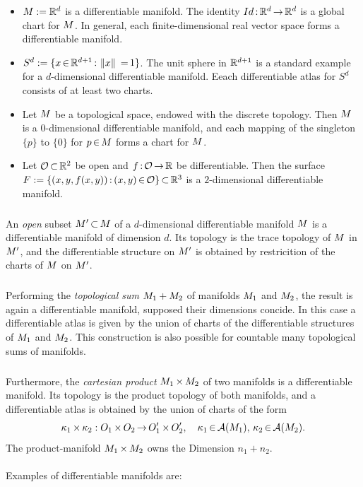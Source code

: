 \documentclass[11pt,twoside]{article}
\begin{document}
\begin{itemize}[leftmargin=15pt]
\item[1.]
${M} := {\mathbb{R}}^d$ is a differentiable manifold.
The identity $Id {\,:\,} {\mathbb{R}}^d {\,\to\,} {\mathbb{R}}^d$ is a global chart for ${M}$.
In general,
each finite-dimensional real vector space forms a differentiable manifold.
\item[2.]
$S^d := \{x {\,\in\,} {\mathbb{R}}^{d+1}{\,:\,} \left\lVert x \right\rVert \, {\,=\,} 1\}$.
The unit sphere in ${\mathbb{R}}^{d+1}$ is a standard example for
a $d$-dimensional differentiable manifold.
Eeach differentiable atlas for $S^d$ consists of at least two charts.
\item[3.]
Let ${M}$ be a topological space, endowed with the discrete topology.
Then ${M}$ is a $0$-dimensional differentiable manifold,
and each mapping of the singleton $\{p\}$
to $\{0\}$ for $p {\,\in\,} {M}$ forms a chart for ${M}$.
\item[4.]
Let $\mathcal{O} {\,\subset\,} {\mathbb{R}}^2$ be open and $f {\,:\,} \mathcal{O} {\,\to\,} {\mathbb{R}}$ be differentiable.
Then the surface
$F := \{(x,y,f(x,y)) {\,:\,} (x,y) {\,\in\,} \mathcal{O}\} {\,\subset\,} {\mathbb{R}}^3$
is a $2$-dimensional differentiable manifold.
\end{itemize}

\subparagraph{}
An \textit{open} subset ${M}' {\,\subset\,} {M}$ of a $d$-dimensional
differentiable manifold ${M}$ is
a differentiable manifold of dimension $d$.
Its topology is the trace topology of ${M}$ in ${M}'$,
and the differentiable structure on ${M}'$ is obtained
by restricition of the charts of ${M}$ on ${M}'$.

\subparagraph{}
Performing the \textit{topological sum} ${M}_1 + {M}_2$
of manifolds ${M}_1$ and ${M}_2$,
the result is again a differentiable manifold,
supposed their dimensions concide.
In this case a differentiable atlas is given by the union of charts
of the differentiable structures of ${M}_1$ and ${M}_2$.
This construction is also possible
for countable many topological sums of manifolds.

\subparagraph{}
Furthermore,
the \textit{cartesian product} $M_1 {\,\times\,} M_2$ of two
manifolds is a differentiable manifold.
Its topology is the product topology of both manifolds,
and a differentiable atlas is obtained 
by the union of charts of the form
\[
\kappa_1 {\,\times\,} \kappa_2: O_1 {\,\times\,} O_2 {\,\to\,} O'_1 {\,\times\,} O'_2,
\quad \kappa_1 {\,\in\,} {\mathcal{A}}(M_1), \, \kappa_2 {\,\in\,} {\mathcal{A}}(M_2).
\]
The product-manifold $M_1 {\,\times\,} M_2$ owns the Dimension
$n_1 + n_2$.

\paragraph{}
Examples of differentiable manifolds are:
\end{document}
